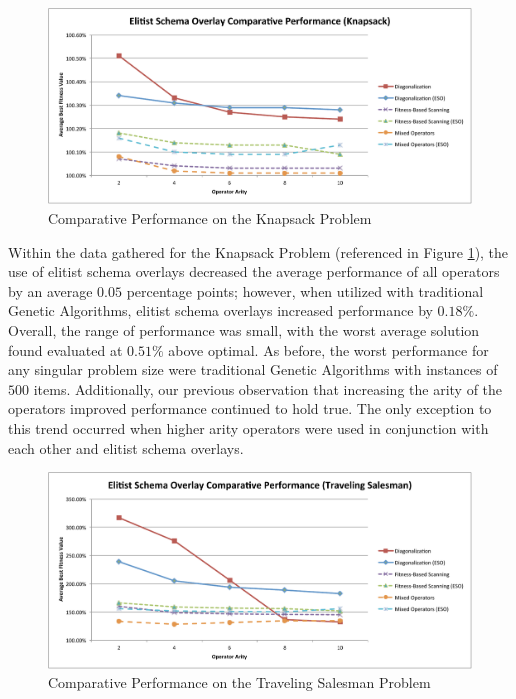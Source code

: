 \begin{figure}[htbp!]
\centering
\includegraphics[scale=0.60]{charts/Both_Knapsack.pdf}
\caption{Comparative Performance on the Knapsack Problem}
\label{fig:both_knapsack}
\end{figure}

Within the data gathered for the Knapsack Problem (referenced in Figure \ref{fig:both_knapsack}), the use of elitist schema overlays decreased the average performance of all operators by an average $0.05$ percentage points; however, when utilized with traditional Genetic Algorithms, elitist schema overlays increased performance by $0.18\%$. Overall, the range of performance was small, with the worst average solution found evaluated at $0.51\%$ above optimal. As before, the worst performance for any singular problem size were traditional Genetic Algorithms with instances of $500$ items. Additionally, our previous observation that increasing the arity of the operators improved performance continued to hold true. The only exception to this trend occurred when higher arity operators were used in conjunction with each other and elitist schema overlays.

\begin{figure}[htbp!]
\centering
\includegraphics[scale=0.60]{charts/Both_TSP.pdf}
\caption{Comparative Performance on the Traveling Salesman Problem}
\label{fig:both_tsp}
\end{figure}

